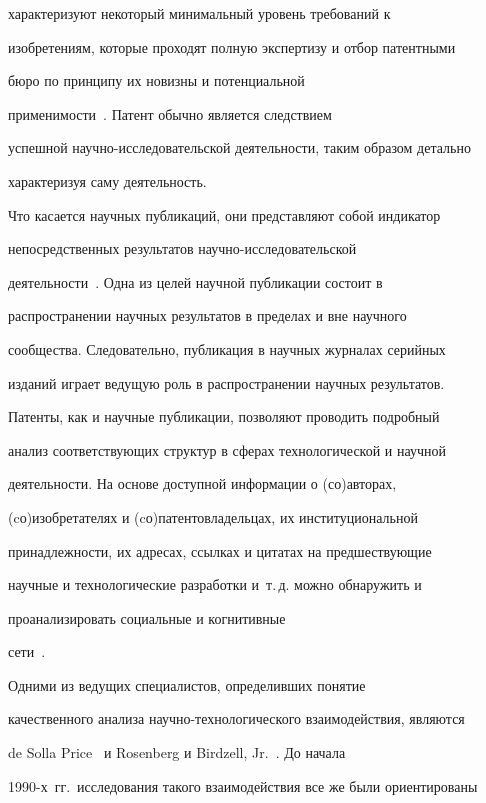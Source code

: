 характеризуют некоторый минимальный уровень требований к 


изобретениям, которые проходят полную экспертизу и отбор патентными 


бюро по принципу их новизны и потенциальной 


     применимости~\cite{11-koz}. Патент обычно является следствием 


успешной научно-исследовательской деятельности, таким образом детально 


характеризуя саму деятельность. 


     


     Что касается научных публикаций, они представляют собой индикатор 


непосредственных результатов научно-исследовательской 


деятельности~\cite{2-koz}. Одна из целей научной публикации состоит в 


распространении научных результатов в пределах и вне научного 


сообщества. Следовательно, публикация в научных журналах серийных 


изданий играет ведущую роль в распространении научных результатов. 


Патенты, как и научные публикации, позволяют проводить подробный 


анализ соответствующих структур в сферах технологической и научной 


деятельности. На основе доступной информации о (со)авторах, 


(cо)изобретателях и (cо)патентовладельцах, их институциональной 


принадлежности, их адресах, ссылках и цитатах на предшествующие 


научные и технологические разработки и~т.\,д. можно обнаружить и 


проанализировать социальные и когнитивные 


     сети~\cite{2-koz, 11-koz}. 


     


     Одними из ведущих специалистов, определивших понятие 


качественного анализа научно-технологического взаимодействия, являются 


de Solla Price~\cite{12-koz} и Rosenberg и Birdzell, Jr.~\cite{13-koz}. До начала 


1990-х~гг.\ исследования такого взаимодействия все же были ориентированы 


